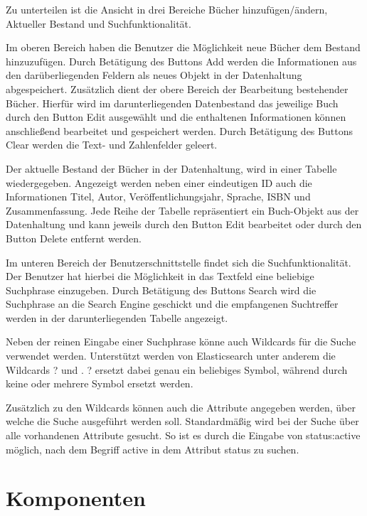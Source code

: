 Zu unterteilen ist die Ansicht in drei Bereiche \glqq Bücher hinzufügen/ändern\grqq{}, \glqq Aktueller Bestand\grqq{} und \glqq Suchfunktionalität\grqq{}.

Im oberen Bereich haben die Benutzer die Möglichkeit neue Bücher dem Bestand hinzuzufügen. Durch Betätigung des Buttons \glqq Add\grqq{} werden die Informationen aus den darüberliegenden Feldern als neues Objekt in der Datenhaltung abgespeichert. Zusätzlich dient der obere Bereich der Bearbeitung bestehender Bücher. Hierfür wird im darunterliegenden Datenbestand das jeweilige Buch durch den Button \glqq Edit\grqq{} ausgewählt und die enthaltenen Informationen können anschließend bearbeitet und gespeichert werden. Durch Betätigung des Buttons \glqq Clear\grqq{} werden die Text- und Zahlenfelder geleert.

Der aktuelle Bestand der Bücher in der Datenhaltung, wird in einer Tabelle wiedergegeben. Angezeigt werden neben einer eindeutigen ID auch die Informationen Titel, Autor, Veröffentlichungsjahr, Sprache, ISBN und Zusammenfassung. Jede Reihe der Tabelle repräsentiert ein Buch-Objekt aus der Datenhaltung und kann jeweils durch den Button \glqq Edit\grqq{} bearbeitet oder durch den Button \glqq Delete\grqq{} entfernt werden.

Im unteren Bereich der Benutzerschnittstelle findet sich die Suchfunktionalität. Der Benutzer hat hierbei die Möglichkeit in das Textfeld eine beliebige Suchphrase einzugeben. Durch Betätigung des Buttons \glqq Search\grqq{} wird die Suchphrase an die Search Engine geschickt und die empfangenen Suchtreffer werden in der darunterliegenden Tabelle angezeigt.

Neben der reinen Eingabe einer Suchphrase könne auch Wildcards für die Suche verwendet werden. Unterstützt werden von Elasticsearch unter anderem die Wildcards \glqq ?\grqq{} und \glqq *\grqq{}. \glqq ?\grqq{} ersetzt dabei genau ein beliebiges Symbol, während durch \glqq *\grqq{} keine oder mehrere Symbol ersetzt werden.

Zusätzlich zu den Wildcards können auch die Attribute angegeben werden, über welche die Suche ausgeführt werden soll. Standardmäßig wird bei der Suche über alle vorhandenen Attribute gesucht. So ist es durch die Eingabe von \glqq status:active\grqq{} möglich, nach dem Begriff \glqq active\grqq{} in dem Attribut \glqq status\grqq{} zu suchen.

\section{Komponenten\label{sec5.2:Unterpunkt-2}}


